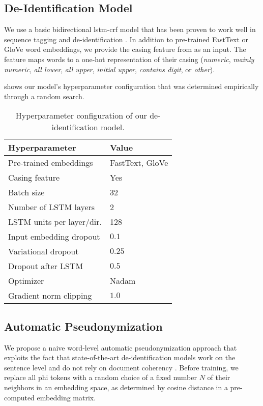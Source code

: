 \subsection{De-Identification Model}\label{sec:deidentification-model}
%
We use a basic bidirectional \ac{lstm}-\ac{crf} model that has been proven to work well in sequence tagging \citep{huang2015bidirectional,lample2016neural} and de-identification \citep{dernoncourt2017identification,liu2017identification}.
%
In addition to pre-trained FastText \citep{bojanowski2016enriching} or GloVe \citep{pennington2014glove} word embeddings, we provide the casing feature from \citet{reimers2017optimal} as an input.
%
The feature maps words to a one-hot representation of their casing (\textit{numeric}, \textit{mainly numeric}, \textit{all lower}, \textit{all upper}, \textit{initial upper}, \textit{contains digit}, or \textit{other}).

%
 shows our model's hyperparameter configuration that was determined empirically through a random search.

\begin{table}
    \centering
    \begin{tabular}{ll}
     \toprule
     Hyperparameter & Value\\
     \midrule
     Pre-trained embeddings & FastText, GloVe\\
     Casing feature & Yes\\
     Batch size & 32\\
     Number of LSTM layers & 2\\
     LSTM units per layer/dir. & 128\\
     Input embedding dropout & $0.1$\\
     Variational dropout & $0.25$\\
     Dropout after LSTM & $0.5$\\
     Optimizer & Nadam\\
     Gradient norm clipping & $1.0$\\
     \bottomrule
    \end{tabular}
    \caption{Hyperparameter configuration of our de-identification model.}\label{tab:deid-hyperparameters}
\end{table}


\subsection{Automatic Pseudonymization}\label{sec:automatic-pseudonymization}
%
We propose a naive word-level automatic pseudonymization approach that exploits the fact that state-of-the-art de-identification models work on the sentence level and do not rely on document coherency \citep{liu2017identification,dernoncourt2017identification}.
%
Before training, we replace all \ac{phi} tokens with a random choice of a fixed number $N$ of their neighbors in an embedding space, as determined by cosine distance in a pre-computed embedding matrix.

